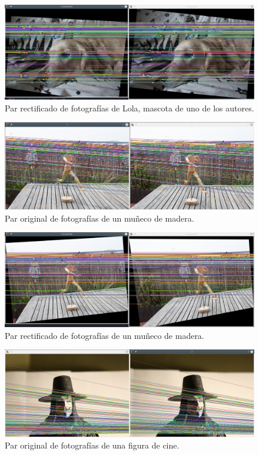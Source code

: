 \documentclass[a4paper, 11pt]{article}
\theoremstyle{definition}
\begin{document}
    \begin{figure}[ht!]
        \centering
        \includegraphics[width=160mm]{Lola-Proyectado.png}
        \caption{Par rectificado de fotografías de Lola, mascota de uno de los autores.}
    \end{figure}

    \begin{figure}[ht!]
        \centering
        \includegraphics[width=160mm]{Monigote-Normal.png}
        \caption{Par original de fotografías de un muñeco de madera.}
    \end{figure}

    \begin{figure}[ht!]
        \centering
        \includegraphics[width=160mm]{Monigote-Proyectado.png}
        \caption{Par rectificado de fotografías de un muñeco de madera.}
    \end{figure}

    \begin{figure}[ht!]
        \centering
        \includegraphics[width=160mm]{V-Normal.png}
        \caption{Par original de fotografías de una figura de cine.}
    \end{figure}
\end{document}

